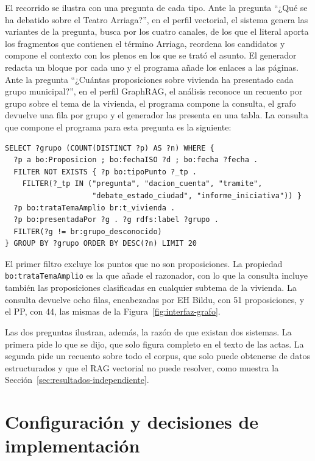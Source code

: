 \documentclass[11pt, a4paper]{report}
\begin{document}
	El recorrido se ilustra con una pregunta de cada tipo. Ante la
	pregunta ``¿Qué se ha debatido sobre el Teatro Arriaga?'', en el perfil
	vectorial, el sistema genera las variantes de la pregunta, busca por los
	cuatro canales, de los que el literal aporta los fragmentos que contienen el
	término Arriaga, reordena los candidatos y compone el contexto con los plenos
	en los que se trató el asunto. El generador redacta un bloque por cada uno y
	el programa añade los enlaces a las páginas. Ante la pregunta ``¿Cuántas
	proposiciones sobre vivienda ha presentado cada grupo municipal?'', en el
	perfil GraphRAG, el análisis reconoce un recuento por grupo sobre el tema de
	la vivienda, el programa compone la consulta, el grafo devuelve una fila por
	grupo y el generador las presenta en una tabla. La consulta que compone el
	programa para esta pregunta es la siguiente:

	{\small
\begin{verbatim}
SELECT ?grupo (COUNT(DISTINCT ?p) AS ?n) WHERE {
  ?p a bo:Proposicion ; bo:fechaISO ?d ; bo:fecha ?fecha .
  FILTER NOT EXISTS { ?p bo:tipoPunto ?_tp .
    FILTER(?_tp IN ("pregunta", "dacion_cuenta", "tramite",
                    "debate_estado_ciudad", "informe_iniciativa")) }
  ?p bo:trataTemaAmplio br:t_vivienda .
  ?p bo:presentadaPor ?g . ?g rdfs:label ?grupo .
  FILTER(?g != br:grupo_desconocido)
} GROUP BY ?grupo ORDER BY DESC(?n) LIMIT 20
\end{verbatim}
	}

	El primer filtro excluye los puntos que no son proposiciones. La propiedad
	\texttt{bo:trataTemaAmplio} es la que añade el razonador, con lo que la consulta incluye también las proposiciones clasificadas en cualquier subtema
	de la vivienda. La consulta devuelve ocho filas, encabezadas por EH Bildu, con
	51 proposiciones, y el PP, con 44, las mismas de la
	Figura~\ref{fig:interfaz-grafo}.

	Las dos preguntas ilustran, además, la razón de que existan dos sistemas. La
	primera pide lo que se dijo, que solo figura completo en el texto de las
	actas. La segunda pide un recuento sobre todo el corpus, que solo puede
	obtenerse de datos estructurados y que el RAG vectorial no puede resolver,
	como muestra la Sección~\ref{sec:resultados-independiente}.

	\section{Configuración y decisiones de implementación}
\end{document}
